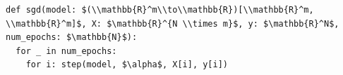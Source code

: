 \documentclass[border=10pt]{standalone}
\begin{document}
\begin{lstlisting}
def sgd(model: $(\\mathbb{R}^m\\to\\mathbb{R})[\\mathbb{R}^m, \\mathbb{R}^m]$, X: $\mathbb{R}^{N \\times m}$, y: $\mathbb{R}^N$, num_epochs: $\mathbb{N}$):
  for _ in num_epochs:
    for i: step(model, $\alpha$, X[i], y[i])
\end{lstlisting}
\end{document}
